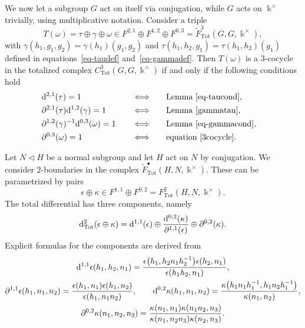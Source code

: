 \documentclass[10pt,a4paper]{amsart}
\numberwithin{equation}{section}
\newcommand{\deri}{{\rm d}}
\newcommand{\wF}{\widetilde{F}}
\newcommand{\Tot}{\mathrm{Tot}}
\begin{document}
\begin{Example}
We now let a subgroup $G$ act on itself via conjugation, while $G$ acts on $\Bbbk^\times$ trivially, using multiplicative notation. Consider a triple
\[T(\omega)=\tau\oplus \gamma \oplus \omega\in F^{2,1} \oplus F^{1,2}\oplus F^{0,3}=\wF^3_{\Tot}(G,G,\Bbbk^\times),\]
with $\gamma(h_1,g_1,g_2)=\gamma(h_1)(g_1,g_2)$ and $\tau(h_1,h_2,g_1)=\tau(h_1,h_2)(g_1)$ defined in equations~\eqref{eq-taudef} and~\eqref{eq-gammadef}.
Then
$T(\omega)$ is a $3$-cocycle in the totalized complex $C^3_{\Tot}(G,G,\Bbbk^\times)$ if and only if the following conditions hold
\begin{alignat*}{4}
&\deri^{2,1}(\tau)=1 && \Longleftrightarrow && \text{Lemma~\ref{eq-taucond}},&\\
&\partial^{2,1}(\tau)\deri^{1,2}(\gamma)=1 && \Longleftrightarrow && \text{Lemma~\ref{gammatau}},&\\
&\partial^{1,2}(\gamma)^{-1}\deri^{0,3}(\omega)=1\quad && \Longleftrightarrow\quad && \text{Lemma~\ref{eq-gammacond}},&\\
&\partial^{0,3}(\omega)=1 && \Longleftrightarrow && \text{equation~\eqref{3cocycle}}.&
\end{alignat*}
\end{Example}



\begin{Example}
Let $N\triangleleft H$ be a normal subgroup and let $H$ act on $N$ by conjugation. We consider $2$-boundaries in the complex $\wF_{\Tot}^{\bullet}(H,N,\Bbbk^\times)$. These can be parametrized by pairs
\[\epsilon \oplus \kappa\in F^{1,1}\oplus F^{0,2}=F^2_{\Tot}(H,N,\Bbbk^\times).\]
The total differential has three components, namely
\[\deri_{\Tot}^2(\epsilon \oplus \kappa)=\deri^{1,1}(\epsilon)\oplus \frac{\deri^{0,2}(\kappa)}{\partial^{1,1}(\epsilon)}\oplus\partial^{0,2}(\kappa).\]
Explicit formulas for the components are derived from
\begin{gather*}
\deri^{1,1}\epsilon(h_1,h_2,n_1)=\frac{ \epsilon\big(h_1,h_2n_1h_2^{-1}\big)\epsilon(h_2,n_1)}{\epsilon(h_1h_2,n_1)},\\
\partial^{1,1}\epsilon(h_1,n_1,n_2)=\frac{\epsilon(h_1,n_1)\epsilon(h_1,n_2)}{\epsilon(h_1,n_1n_2)}, \qquad
\deri^{0,2}\kappa(h_1,n_1,n_2)=\frac{\kappa\big(h_1n_1h_1^{-1},h_1n_2h_1^{-1}\big)}{\kappa(n_1,n_2)},\\
\partial^{0,2}\kappa(n_1,n_2,n_3)=\frac{\kappa(n_1,n_1)\kappa(n_1n_2,n_3)}{\kappa(n_1,n_2n_3)\kappa(n_2,n_3)}.
\end{gather*}
\end{Example}
\end{document}
